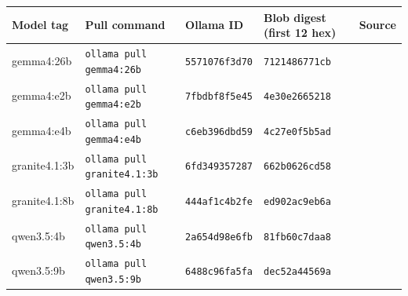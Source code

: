 \begin{tabular}{lllll}
\toprule
Model tag & Pull command & Ollama ID & Blob digest (first 12 hex) & Source \\
\midrule
gemma4:26b & \texttt{ollama pull gemma4:26b} & \texttt{5571076f3d70} & \texttt{7121486771cb} & \cite{google2026gemma426ba4bit} \\
gemma4:e2b & \texttt{ollama pull gemma4:e2b} & \texttt{7fbdbf8f5e45} & \texttt{4e30e2665218} & \cite{google2026gemma4e2b} \\
gemma4:e4b & \texttt{ollama pull gemma4:e4b} & \texttt{c6eb396dbd59} & \texttt{4c27e0f5b5ad} & \cite{google2026gemma4e4b} \\
granite4.1:3b & \texttt{ollama pull granite4.1:3b} & \texttt{6fd349357287} & \texttt{662b0626cd58} & \cite{ibm2026granite413b} \\
granite4.1:8b & \texttt{ollama pull granite4.1:8b} & \texttt{444af1c4b2fe} & \texttt{ed902ac9eb6a} & \cite{ibm2026granite418b} \\
qwen3.5:4b & \texttt{ollama pull qwen3.5:4b} & \texttt{2a654d98e6fb} & \texttt{81fb60c7daa8} & \cite{qwen2026qwen354b} \\
qwen3.5:9b & \texttt{ollama pull qwen3.5:9b} & \texttt{6488c96fa5fa} & \texttt{dec52a44569a} & \cite{qwen2026qwen359b} \\
\bottomrule
\end{tabular}
